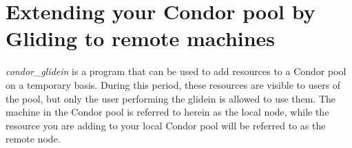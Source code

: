 \newcommand{\Prog}[1]{\textit{#1}}                 %
\newcommand{\Url}[1]{{#1}}   %
\newcommand{\Condor}[1]{\Prog{condor\_#1}}
\newcommand{\condor}[1]{condor\_#1}
\newcommand{\Env}[1]{\texttt{#1}}      %


\section{\label{sec:Glidein}Extending your Condor pool by Gliding to remote machines}

\Condor{glidein} is a program that can be used to add resources to a Condor 
pool on a temporary basis. During this period, these resources are visible 
to users of the pool, but only the user performing the glidein is allowed 
to use them. The machine in the Condor pool is referred to herein as the
local node, while the resource you are adding to your local Condor pool
will be referred to as the remote node.

